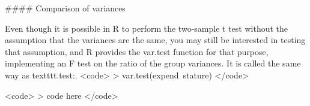 


#### {Comparison of variances}


Even though it is possible in R to perform the two-sample t test without
the assumption that the variances are the same, you may still be interested
in testing that assumption, and R provides the var.test function for that
purpose, implementing an F test on the ratio of the group variances. It is
called the same way as texttt{t.test}:.
<code>
> var.test(expend~stature)
</code>

      
      

 <code>
> code here
 </code>
